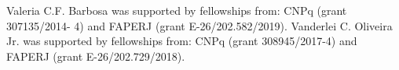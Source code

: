 

\begin{acknowledgements}
Valeria C.F. Barbosa was supported by fellowships from: CNPq (grant 307135/2014- 4) and FAPERJ (grant E-26/202.582/2019). 
Vanderlei C. Oliveira Jr. was supported by fellowships from: CNPq (grant 308945/2017-4) and FAPERJ (grant E-26/202.729/2018). 
\end{acknowledgements}
